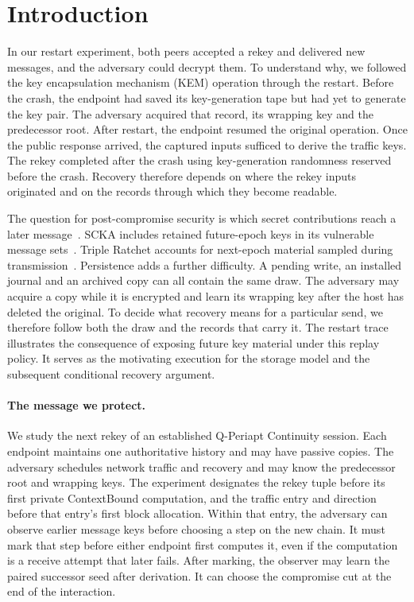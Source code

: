 \section{Introduction}
\label{sec:introduction}

In our restart experiment, both peers accepted a rekey and delivered new
messages, and the adversary could decrypt them. To understand why, we
followed the key encapsulation mechanism (KEM) operation through the
restart. Before the crash, the endpoint had saved its key-generation
tape but had yet to generate the key pair. The adversary acquired that
record, its wrapping key and the predecessor root. After restart, the
endpoint resumed the original operation. Once the public response
arrived, the captured inputs sufficed to derive the traffic keys.
The rekey completed after the crash using key-generation randomness
reserved before the crash. Recovery therefore depends on where the rekey
inputs originated and on the records through which they become readable.

The question for post-compromise security is which secret contributions
reach a later message~\cite{signal2020,tripleratchet2025}. SCKA includes
retained future-epoch keys in its vulnerable message sets~\cite{scka2025}.
Triple Ratchet accounts for next-epoch material sampled during
transmission~\cite{tripleratchet2025}. Persistence adds a further
difficulty. A pending write, an installed journal and an archived copy
can all contain the same draw. The adversary may acquire a copy while
it is encrypted and learn its wrapping key after the host has deleted
the original. To decide what recovery means for a particular send, we
therefore follow both the draw and the records that carry it.
The restart trace illustrates the consequence of exposing future key
material under this replay policy. It serves as the motivating execution
for the storage model and the subsequent conditional recovery argument.

\paragraph{The message we protect.}
We study the next rekey of an established Q-Periapt Continuity session.
Each endpoint maintains one authoritative history and may have passive
copies. The adversary schedules network traffic and recovery and may
know the predecessor root and wrapping keys. The experiment designates
the rekey tuple before its first private ContextBound computation, and
the traffic entry and direction before that entry's first block allocation.
Within that entry, the adversary can observe earlier message keys before
choosing a step on the new chain. It must mark
that step before either endpoint first computes it, even if the
computation is a receive attempt that later fails. After marking, the
observer may learn the paired successor seed after derivation. It can choose the
compromise cut at the end of the interaction.

